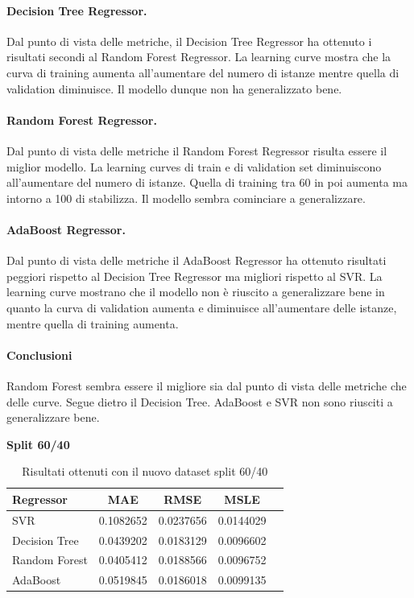 \paragraph{\textbf{Decision Tree Regressor}.}
Dal punto di vista delle metriche, il Decision Tree Regressor ha ottenuto i risultati secondi al Random Forest Regressor. 
La learning curve mostra che la curva di training aumenta all'aumentare del numero di istanze mentre quella di validation diminuisce. Il modello dunque non ha generalizzato bene.
\paragraph{\textbf{Random Forest Regressor}.}
Dal punto di vista delle metriche il Random Forest Regressor risulta essere il miglior modello.
La learning curves di train e di validation set diminuiscono all'aumentare del numero di istanze. Quella di training tra 60 in poi aumenta ma intorno a 100 di stabilizza. Il modello sembra cominciare a generalizzare.
\paragraph{\textbf{AdaBoost Regressor}.}
Dal punto di vista delle metriche il AdaBoost Regressor ha ottenuto risultati peggiori rispetto al Decision Tree Regressor ma migliori rispetto al SVR.
La learning curve mostrano che il modello non è riuscito a generalizzare bene
in quanto la curva di validation aumenta e diminuisce all'aumentare delle istanze, mentre quella di training aumenta.

\paragraph{\textbf{Conclusioni}} Random Forest sembra essere il migliore sia dal punto di vista delle metriche che delle curve. Segue dietro il Decision Tree. AdaBoost e SVR non sono riusciti a generalizzare bene.
\newpage


\noindent\textbf{Split 60/40}

\begin{table}[H]
    \centering
    \begin{tabular}{|>{\centering\arraybackslash}m{5cm}|c|c|c|c|}
        \hline
        \textbf{Regressor} & \textbf{MAE} & \textbf{RMSE} & \textbf{MSLE} \\ [10pt]
        \hline
        SVR & 0.1082652 & 0.0237656 & 0.0144029 \\ [10pt]
        \hline
        Decision Tree & 0.0439202 & 0.0183129 & 0.0096602 \\ [10pt]
        \hline
        Random Forest & 0.0405412 & 0.0188566 & 0.0096752 \\ [10pt]
        \hline
        AdaBoost & 0.0519845 & 0.0186018 & 0.0099135 \\ [10pt]
        \hline
    \end{tabular}
    \caption{Risultati ottenuti con il nuovo dataset split 60/40}
    \label{tab:results}
\end{table}


